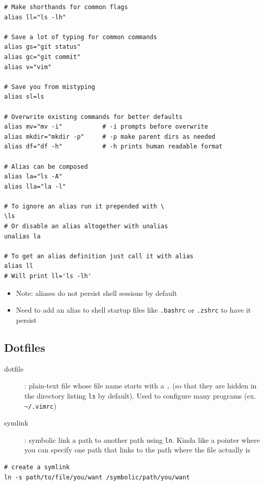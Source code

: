 \documentclass[letterpaper,12pt]{article}
\begin{document}
\begin{lstlisting}
# Make shorthands for common flags
alias ll="ls -lh"

# Save a lot of typing for common commands
alias gs="git status"
alias gc="git commit"
alias v="vim"

# Save you from mistyping
alias sl=ls

# Overwrite existing commands for better defaults
alias mv="mv -i"           # -i prompts before overwrite
alias mkdir="mkdir -p"     # -p make parent dirs as needed
alias df="df -h"           # -h prints human readable format

# Alias can be composed
alias la="ls -A"
alias lla="la -l"

# To ignore an alias run it prepended with \
\ls
# Or disable an alias altogether with unalias
unalias la

# To get an alias definition just call it with alias
alias ll
# Will print ll='ls -lh'
\end{lstlisting}

\begin{itemize}
 \item Note: aliases do not persist shell sessions by default
 \item Need to add an alias to shell startup files like \lstinline{.bashrc} or \lstinline{.zshrc} to have it persist
\end{itemize}

\subsection{Dotfiles}

\begin{description}
 \item[dotfile]: plain-text file whose file name starts with a \lstinline{.} (so that they are hidden in the directory listing \lstinline{ls} by default). Used to configure many programs (ex. \lstinline{~/.vimrc})
 \item[symlink]: symbolic link a path to another path using \lstinline{ln}. Kinda like a pointer where you can specify one path that links to the path where the file actually is
\end{description}

\begin{lstlisting}
# create a symlink
ln -s path/to/file/you/want /symbolic/path/you/want
\end{lstlisting}
\end{document}
